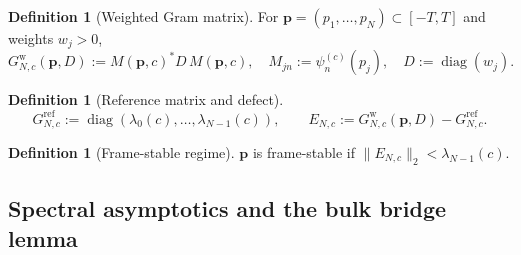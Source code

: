 \documentclass[12pt,a4paper]{amsart}
\theoremstyle{definition}
\newtheorem{definition}[theorem]{Definition}
\newcommand{\EN}{E_{N,c}}
\newcommand{\norm}[1]{\|#1\|}
\begin{document}
\begin{definition}[Weighted Gram matrix]\label{def:GramForm}
For $\mathbf{p}=(p_1,\dots,p_N)\subset[-T,T]$ and weights $w_j>0$,
\[
  G^{\mathrm{w}}_{N,c}(\mathbf{p},D)
  :=M(\mathbf{p},c)^*D\,M(\mathbf{p},c),
  \quad M_{jn}:=\psi_n^{(c)}(p_j),\quad
  D:=\operatorname{diag}(w_j).
\]
\end{definition}

\begin{definition}[Reference matrix and defect]\label{def:ref_matrix}
\[
  G^{\mathrm{ref}}_{N,c}
  :=\operatorname{diag}(\lambda_0(c),\dots,\lambda_{N-1}(c)),
  \qquad
  \EN:=G^{\mathrm{w}}_{N,c}(\mathbf{p},D)-G^{\mathrm{ref}}_{N,c}.
\]
\end{definition}

\begin{definition}[Frame-stable regime]\label{def:framestable}
$\mathbf{p}$ is frame-stable if $\norm{\EN}_2<\lambda_{N-1}(c)$.
\end{definition}

\subsection{Spectral asymptotics and the bulk bridge lemma}
\end{document}
